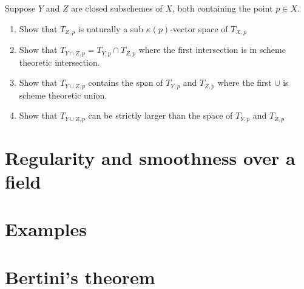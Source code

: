 \documentclass[11pt]{book} %
\begin{document}
\begin{exr}
Suppose $Y$ and $Z$ are closed subschemes of $X$, both containing the point $p\in X$.
\begin{enumerate}[label=(\alph*)]
\item Show that $T_{Z,p}$ is naturally a sub $\kappa(p)$-vector space of $T_{X,p}$
\item Show that $T_{Y\cap Z,p}=T_{Y,p}\cap T_{Z,p}$ where the first intersection is in scheme theoretic intersection.
\item Show that $T_{Y\cup Z,p}$ contains the span of $T_{Y,p}$ and $T_{Z,p}$ where the first $\cup$ is scheme theoretic union.
\item Show that $T_{Y\cup Z,p}$ can be strictly larger than the space of $T_{Y,p}$ and $T_{Z,p}$ 
\end{enumerate}
\end{exr}
\section{Regularity and smoothness over a field}
\section{Examples}
\section{Bertini's theorem}
\end{document}
